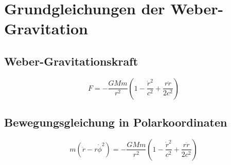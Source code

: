 \section{Grundgleichungen der Weber-Gravitation}

\subsection*{Weber-Gravitationskraft}
\begin{equation}
F = -\frac{GMm}{r^2}\left(1 - \frac{\dot{r}^2}{c^2} + \frac{r\ddot{r}}{2c^2}\right)
\end{equation}

\subsection*{Bewegungsgleichung in Polarkoordinaten}
\begin{equation}
m(\ddot{r} - r\dot{\phi}^2) = -\frac{GMm}{r^2}\left(1 - \frac{\dot{r}^2}{c^2} + \frac{r\ddot{r}}{2c^2}\right)
\end{equation}
